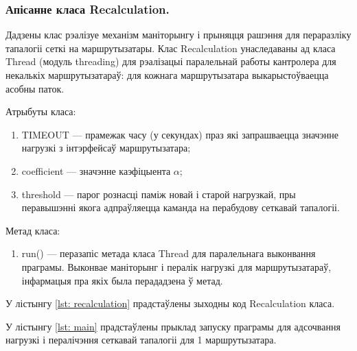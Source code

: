 

\vspace{-\baselineskip}

\subsubsection{Апісанне класа Recalculation.}

Дадзены клас рэалізуе механізм маніторынгу і прыняцця рашэння для пераразліку тапалогіі сеткі на маршрутызатары.
Клас Recalculation унаследаваны ад класа Thread (модуль threading) для рэалізацыі паралельнай работы кантролера для
некалькіх маршрутызатараў: для кожнага маршрутызатара выкарыстоўваецца асобны паток.

Атрыбуты класа:
\begin{enumerate}
    \item TIMEOUT --- прамежак часу (у секундах) праз які запрашваецца значэнне нагрузкі з інтэрфейсаў маршрутызатара;
    \item coefficient --- значэнне каэфіцыента $\alpha$;
    \item threshold --- парог рознасці паміж новай і старой нагрузкай, пры
    перавышэнні якога адпраўляецца каманда на перабудову сеткавай тапалогіі.
\end{enumerate}

Метад класа:
\begin{enumerate}
    \item run() --- перазапіс метада класа Thread для паралельнага выконвання праграмы. Выконвае маніторынг і пералік нагрузкі для маршрутызатараў, інфармацыя пра якіх была перададзена ў метад.
\end{enumerate}

У лістынгу \ref{lst: recalculation} прадстаўлены зыходны код Recalculation класа.



У лістынгу  \ref{lst: main} прадстаўлены прыклад запуску праграмы для адсочвання
нагрузкі і пералічэння сеткавай тапалогіі для 1 маршрутызатара.



